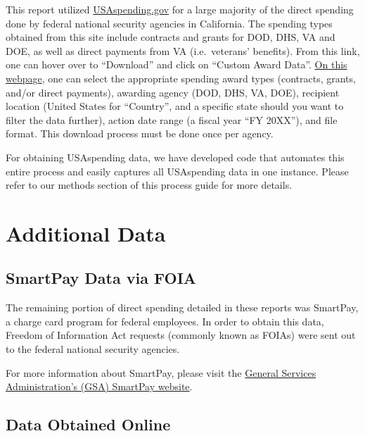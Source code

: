 \documentclass[
]{book}
\begin{document}
This report utilized \href{https://www.usaspending.gov/}{USAspending.gov} for a large majority of the direct spending done by federal national security agencies in California. The spending types obtained from this site include contracts and grants for DOD, DHS, VA and DOE, as well as direct payments from VA (i.e.~veterans' benefits). From this link, one can hover over to ``Download'' and click on ``Custom Award Data''. \href{https://www.usaspending.gov/download_center/custom_award_data}{On this webpage}, one can select the appropriate spending award types (contracts, grants, and/or direct payments), awarding agency (DOD, DHS, VA, DOE), recipient location (United States for ``Country'', and a specific state should you want to filter the data further), action date range (a fiscal year ``FY 20XX''), and file format. This download process must be done once per agency.

For obtaining USAspending data, we have developed code that automates this entire process and easily captures all USAspending data in one instance. Please refer to our methods section of this process guide for more details.

\hypertarget{additional-data}{%
\section{Additional Data}\label{additional-data}}

\hypertarget{smartpay-data-via-foia}{%
\subsection{SmartPay Data via FOIA}\label{smartpay-data-via-foia}}

The remaining portion of direct spending detailed in these reports was SmartPay, a charge card program for federal employees. In order to obtain this data, Freedom of Information Act requests (commonly known as FOIAs) were sent out to the federal national security agencies.

For more information about SmartPay, please visit the \href{https://www.gsa.gov/travel/plan-book/gsa-smartpay}{General Services Administration's (GSA) SmartPay website}.

\hypertarget{data-obtained-online}{%
\subsection{Data Obtained Online}\label{data-obtained-online}}
\end{document}
